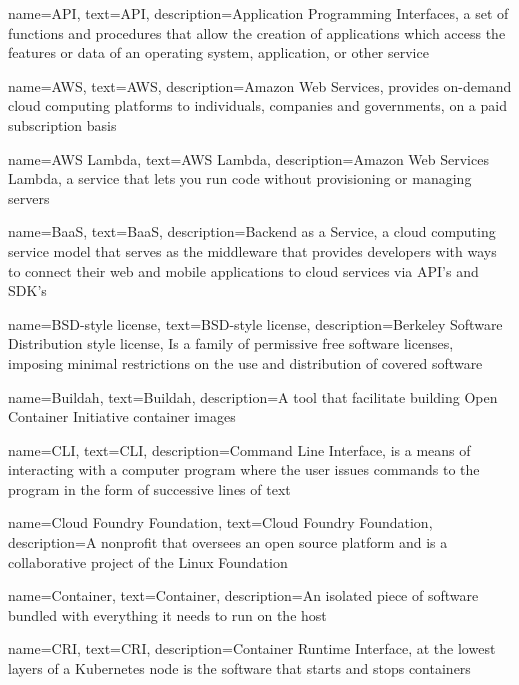 {
    name={API},
    text={API},
    description={Application Programming Interfaces, a set of functions and procedures that allow the creation of applications which access the features or data of an operating system, application, or other service}
}

{
    name={AWS},
    text={AWS},
    description={Amazon Web Services,  provides on-demand cloud computing platforms to individuals, companies and governments, on a paid subscription basis}
}


{
    name={AWS Lambda},
    text={AWS Lambda},
    description={Amazon Web Services Lambda, a service that lets you run code without provisioning or managing servers}
}

{
    name={BaaS},
    text={BaaS},
    description={Backend as a Service, a cloud computing service model that serves as the middleware that provides developers with ways to connect their web and mobile applications to cloud services via \gls{API}'s and \gls{SDK}'s}
}

{
    name={BSD-style license},
    text={BSD-style license},
    description={Berkeley Software Distribution style license, Is a family of permissive free software licenses, imposing minimal restrictions on the use and distribution of covered software}
}

{
    name={Buildah},
    text={Buildah},
    description={A tool that facilitate building Open Container Initiative container images}
}

{
    name={CLI},
    text={CLI},
    description={Command Line Interface, is a means of interacting with a computer program where the user issues commands to the program in the form of successive lines of text}
}

{
    name={Cloud Foundry Foundation},
    text={Cloud Foundry Foundation},
    description={A nonprofit that oversees an open source platform and is a collaborative project of the Linux Foundation}
}

{
    name={Container},
    text={Container},
    description={An isolated piece of software bundled with everything it needs to run on the host}
}

{
    name={CRI},
    text={CRI},
    description={Container Runtime Interface, at the lowest layers of a Kubernetes node is the software that starts and stops containers}
}

